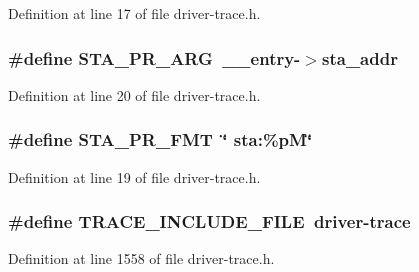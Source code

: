 Definition at line 17 of file driver-\/trace.\-h.

\hypertarget{driver-trace_8h_a3b71cc34bae124028f19970a4220d4ab}{
\subsubsection[{S\-T\-A\-\_\-\-P\-R\-\_\-\-A\-R\-G}]{\setlength{\rightskip}{0pt plus 5cm}\#define S\-T\-A\-\_\-\-P\-R\-\_\-\-A\-R\-G~\-\_\-\-\_\-entry-\/$>$sta\-\_\-addr}}\label{driver-trace_8h_a3b71cc34bae124028f19970a4220d4ab}


Definition at line 20 of file driver-\/trace.\-h.

\hypertarget{driver-trace_8h_a73d0cd445b999888e3f21698b769c843}{
\subsubsection[{S\-T\-A\-\_\-\-P\-R\-\_\-\-F\-M\-T}]{\setlength{\rightskip}{0pt plus 5cm}\#define S\-T\-A\-\_\-\-P\-R\-\_\-\-F\-M\-T~\char`\"{} sta\-:\%p\-M\char`\"{}}}\label{driver-trace_8h_a73d0cd445b999888e3f21698b769c843}


Definition at line 19 of file driver-\/trace.\-h.

\hypertarget{driver-trace_8h_a1d5647dfae4ac3375129dfe95a164965}{
\subsubsection[{T\-R\-A\-C\-E\-\_\-\-I\-N\-C\-L\-U\-D\-E\-\_\-\-F\-I\-L\-E}]{\setlength{\rightskip}{0pt plus 5cm}\#define T\-R\-A\-C\-E\-\_\-\-I\-N\-C\-L\-U\-D\-E\-\_\-\-F\-I\-L\-E~driver-\/trace}}\label{driver-trace_8h_a1d5647dfae4ac3375129dfe95a164965}


Definition at line 1558 of file driver-\/trace.\-h.

